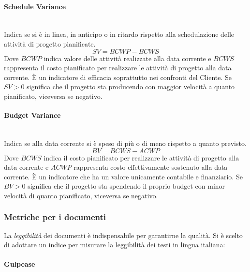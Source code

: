 			\paragraph{Schedule Variance} \mbox{} \\

			Indica se si è in linea, in anticipo o in ritardo rispetto alla schedulazione delle attività di progetto pianificate.
			\[
			SV = BCWP - BCWS
			\]
			Dove $BCWP$ indica valore delle attività realizzate alla data corrente e $BCWS$ rappresenta il costo pianificato per realizzare le attività di progetto alla data corrente. 
			È un indicatore di efficacia soprattutto nei confronti del Cliente. Se $SV>0$ significa che il progetto sta producendo con maggior velocità a quanto pianificato, viceversa se negativo.
			
			\paragraph{Budget Variance}\mbox{} \\
			
			Indica se alla data corrente si è speso di più o di meno rispetto a quanto previsto.
			\[
			BV = BCWS - ACWP
			\]
			Dove $BCWS$ indica il costo pianificato per realizzare le attività di  progetto alla  data corrente e $ACWP$ rappresenta costo effettivamente sostenuto alla data  corrente.
			È un indicatore che ha un valore unicamente contabile e finanziario. Se $BV>0$ significa che il progetto sta spendendo il proprio budget con minor velocità di quanto pianificato, viceversa se negativo. 

			
		\subsubsection{Metriche per i documenti}
		\label{metrichedocumenti}
		
		La \emph{leggibilità} dei documenti è indispensabile per garantirne la qualità. Si è scelto di adottare un indice per misurare la leggibilità dei testi in lingua italiana:
			
			\paragraph{Gulpease}\mbox{} \\
			\label{gulpease}
			
